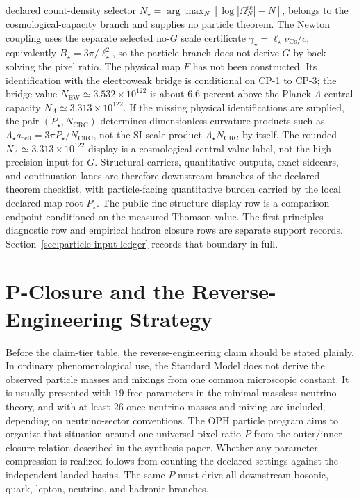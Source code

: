 \documentclass[11pt]{article}
\begin{document}
declared count-density selector
\(N_\star=\arg\max_N[\log|\Omega^{\mathrm{sc}}_N|-N]\), belongs to the cosmological-capacity branch and
supplies no particle theorem. The Newton coupling uses the separate
selected no-\(G\) scale certificate \(\gamma_\star=\ell_\star\nu_{\mathrm{Cs}}/c\), equivalently
\(B_\star=3\pi/\ell_\star^2\), so the particle branch does not derive \(G\) by back-solving the
pixel ratio. The physical map \(F\) has not been constructed. Its identification with the
electroweak bridge is conditional on CP-1 to CP-3; the bridge value
\(N_{\mathrm{EW}}\simeq3.532\times10^{122}\) is about \(6.6\) percent above the
Planck-\(\Lambda\) central capacity \(N_\Lambda\simeq3.313\times10^{122}\). If the missing
physical identifications are supplied, the pair \((P_\star,N_{\mathrm{CRC}})\) determines
dimensionless curvature products such as
\(\Lambda_\star a_{\mathrm{cell}}=3\pi P_\star/N_{\mathrm{CRC}}\), not the SI scale product
\(\Lambda_\star N_{\mathrm{CRC}}\) by itself. The rounded
\(N_\Lambda\simeq3.313\times10^{122}\) display is a cosmological central-value label, not the
high-precision input for \(G\). Structural carriers, quantitative outputs, exact sidecars, and
continuation lanes are therefore downstream branches of the declared theorem checklist, with
particle-facing quantitative burden carried by the local declared-map root \(P_\star\).
The public fine-structure display row is a comparison endpoint conditioned on the measured
Thomson value. The first-principles diagnostic row and empirical hadron closure
rows are separate support records.
Section~\ref{sec:particle-input-ledger}
records that boundary in full.

\section{P-Closure and the Reverse-Engineering Strategy}

Before the claim-tier table, the reverse-engineering claim should be stated plainly. In
ordinary phenomenological use, the Standard Model does not derive the observed particle masses and
mixings from one common microscopic constant. It is usually presented with \(19\) free parameters
in the minimal massless-neutrino theory, and with at least \(26\) once neutrino masses and mixing
are included, depending on neutrino-sector conventions. The OPH particle program aims to organize
that situation around one universal pixel ratio \(P\) from the outer/inner closure relation
described in the synthesis paper. Whether any parameter compression is realized follows
from counting the declared settings against the independent landed basins. The same \(P\) must drive all
downstream bosonic, quark, lepton, neutrino, and hadronic branches.
\end{document}
